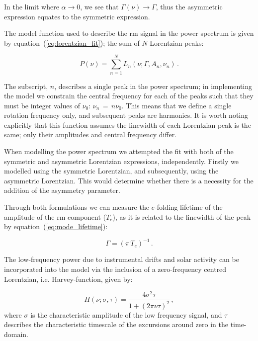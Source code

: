 In the limit where $\alpha \rightarrow 0$, we see that $\Gamma(\nu) \rightarrow \Gamma$, thus the asymmetric expression equates to the symmetric expression.

The model function used to describe the \gls{rm} signal in the power spectrum is given by equation~(\ref{eq:lorentzian_fit}); the sum of $N$ Lorentzian-peaks:

\begin{equation}
P(\nu) = \sum_{n=1}^{N} L_n(\nu; \Gamma, A_n, \nu_n) \, .
\label{eq:lorentzian_fit}
\end{equation}

The subscript, $n$, describes a single peak in the power spectrum; in implementing the model we constrain the central frequency for each of the peaks such that they must be integer values of $\nu_0$: $\nu_n \, = \, n \nu_0$. This means that we define a single rotation frequency only, and subsequent peaks are harmonics. It is worth noting explicitly that this function assumes the linewidth of each Lorentzian peak is the same; only their amplitudes and central frequency differ.

When modelling the power spectrum we attempted the fit with both of the symmetric and asymmetric Lorentzian expressions, independently. Firstly we modelled using the symmetric Lorentzian, and subsequently, using the asymmetric Lorentzian. This would determine whether there is a necessity for the addition of the asymmetry parameter.

Through both formulations we can measure the $e$-folding lifetime of the amplitude of the \gls{rm} component ($T_e$), as it is related to the linewidth of the peak by equation~(\ref{eq:mode_lifetime}):

\begin{equation}
\Gamma  = (\pi \, T_e)^{-1} \, .
\label{eq:mode_lifetime}
\end{equation}


The low-frequency power due to instrumental drifts and solar activity can be incorporated into the model via the inclusion of a zero-frequency centred Lorentzian, i.e. Harvey-function, given by:

\begin{equation}
H(\nu; \sigma, \tau) = \frac{4{\sigma}^2\tau}{1 + (2\pi \nu\tau)^2} \, ,
\label{eq:harvey}
\end{equation}
%
where $\sigma$ is the characteristic amplitude of the low frequency signal, and $\tau$ describes the characteristic timescale of the excursions around zero in the time-domain.

